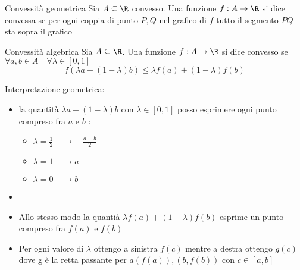 \begin{definizione}{Convessità geometrica}
	Sia $A \subseteq  \R$ convesso. Una funzione $f : A \to \R$ si dice \underline{ convessa }se per ogni coppia di punto $P, Q$ nel grafico di $f$ tutto il segmento $PQ$ sta sopra il grafico

\end{definizione}

\begin{definizione}{Convessità algebrica}
	Sia $A \subseteq \R$. Una funzione $f: A \to \R$ si dice convesso se $ \forall a,b \in  A \quad \forall \lambda \in \left[ 0,1 \right] $
	\[
		f\left( \lambda  a + \left( 1-\lambda  \right) b \right) \le \lambda f\left( a \right)  + \left( 1-\lambda  \right) f\left( b \right)
	\]

\end{definizione}
Interpretazione geometrica:
\begin{itemize}
	\item la quantità $\lambda a + \left( 1- \lambda  \right) b$ con $ \lambda  \in  \left[ 0,1 \right] $ posso esprimere ogni punto compreso fra  $a$ e $b$ :
	      \begin{itemize}
		      \item $\lambda  = \frac{1}{2} \quad \rightarrow \quad \frac{a+b}{2}$
		      \item $\lambda  = 1 \quad \rightarrow a$
		      \item $\lambda  = 0 \quad \rightarrow b$
	      \end{itemize}
	\item
	\item Allo stesso modo la quantià $\lambda f\left( a \right)  + \left( 1-\lambda  \right) f\left( b \right)$ esprime un punto compreso fra $f\left( a \right) $ e $f\left( b \right) $
	\item Per ogni valore di $\lambda $ ottengo a sinistra $f\left( c \right) $ mentre a destra ottengo $g\left( c \right) $ dove g è la retta passante per $a\left( f\left( a \right)  \right) , \left( b,f\left( b \right)  \right)  $ con $c \in  \left[ a,b \right] $
\end{itemize}
